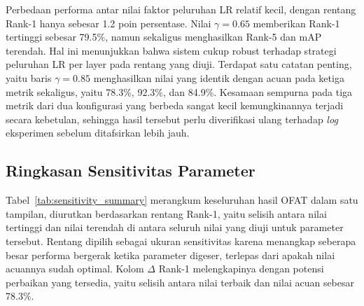 Perbedaan performa antar nilai faktor peluruhan LR relatif kecil, dengan rentang Rank-1 hanya sebesar 1.2 poin persentase. Nilai $\gamma=0{.}65$ memberikan Rank-1 tertinggi sebesar 79.5\%, namun sekaligus menghasilkan Rank-5 dan mAP terendah. Hal ini menunjukkan bahwa sistem cukup robust terhadap strategi peluruhan LR per layer pada rentang yang diuji. Terdapat satu catatan penting, yaitu baris $\gamma=0{.}85$ menghasilkan nilai yang identik dengan acuan pada ketiga metrik sekaligus, yaitu 78.3\%, 92.3\%, dan 84.9\%. Kesamaan sempurna pada tiga metrik dari dua konfigurasi yang berbeda sangat kecil kemungkinannya terjadi secara kebetulan, sehingga hasil tersebut perlu diverifikasi ulang terhadap \textit{log} eksperimen sebelum ditafsirkan lebih jauh.

\subsection{Ringkasan Sensitivitas Parameter}
\label{subsec:ringkasan_sensitivitas}

Tabel~\ref{tab:sensitivity_summary} merangkum keseluruhan hasil OFAT dalam satu tampilan, diurutkan berdasarkan rentang Rank-1, yaitu selisih antara nilai tertinggi dan nilai terendah di antara seluruh nilai yang diuji untuk parameter tersebut. Rentang dipilih sebagai ukuran sensitivitas karena menangkap seberapa besar performa bergerak ketika parameter digeser, terlepas dari apakah nilai acuannya sudah optimal. Kolom $\Delta$ Rank-1 melengkapinya dengan potensi perbaikan yang tersedia, yaitu selisih antara nilai terbaik dan nilai acuan sebesar 78.3\%.

